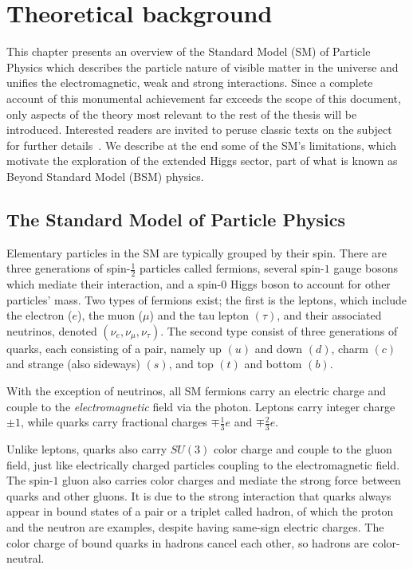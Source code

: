 \chapter{Theoretical background}
\label{chap:theory}

This chapter presents an overview of the Standard Model \cite{GLASHOW1961579,PhysRevLett.19.1264} (SM) of Particle Physics which describes the particle nature of visible matter in the universe and unifies the electromagnetic, weak and strong interactions. 
Since a complete account of this monumental achievement far exceeds the scope of this document, only aspects of the theory most relevant to the rest of the thesis will be introduced. 
Interested readers are invited to peruse classic texts on the subject for further details~\cite{Peskin_2018, Halzen_Martin_2016, Schwartz_2014}.
We describe at the end some of the SM's limitations, which motivate the exploration of the extended Higgs sector, part of what is known as Beyond Standard Model (BSM) physics.

\section{The Standard Model of Particle Physics}

Elementary particles in the SM are typically grouped by their spin. 
There are three generations of spin-$\frac{1}{2}$ particles called fermions, several spin-$1$ gauge bosons which mediate their interaction, and a spin-$0$ Higgs boson to account for other particles' mass. 
Two types of fermions exist; the first is the leptons, which include the electron ($e$), the muon ($\mu$) and the tau lepton $(\tau)$, and their associated neutrinos, denoted $(\nu_e, \nu_{\mu}, \nu_{\tau})$. 
The second type consist of three generations of quarks, each consisting of a pair, namely up $(u)$ and down $(d)$, charm $(c)$ and strange (also sideways) $(s)$, and top $(t)$ and bottom $(b)$. 

With the exception of neutrinos, all SM fermions carry an electric charge and couple to the \textit{electromagnetic} field via the photon. Leptons carry integer charge $\pm1$, while quarks carry fractional charges $\mp\frac{1}{3}e$ and $\mp\frac{2}{3}e$. 

Unlike leptons, quarks also carry $SU(3)$ color charge and couple to the gluon field, just like electrically charged particles coupling to the electromagnetic field. 
The spin-$1$ gluon also carries color charges and mediate the strong force between quarks and other gluons. 
It is due to the strong interaction that quarks always appear in bound states of a pair or a triplet called hadron, of which the proton and the neutron are examples, despite having same-sign electric charges. 
The color charge of bound quarks in hadrons cancel each other, so hadrons are color-neutral. 

